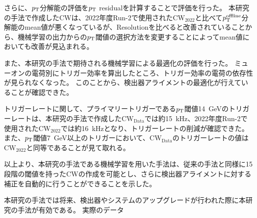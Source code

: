 さらに、$p_{\rm{T}}$分解能の評価を$p_{\rm{T}}$ residualを計算することで評価を行った。
本研究の手法で作成したCWは、2022年度Run-2で使用された$\mathrm{CW_{2022}}$と比べて$p_{\rm{T}}^{\rm{offline}}$分解能のmean値が悪くなっているが、Resolutionを比べると改善されていることから、機械学習の出力からの$p_{\rm{T}}$閾値の選択方法を変更することによってmean値においても改善が見込まれる。

また、本研究の手法で期待される機械学習による最適化の評価を行った。
ミューオンの電荷別にトリガー効率を算出したところ、トリガー効率の電荷の依存性が見られなくなった。
このことから、検出器アライメントの最適化が行えていることが確認できた。

トリガーレートに関して、プライマリートリガーである$p_{\rm{T}}$閾値14~GeVのトリガーレートは、本研究の手法で作成した$\mathrm{CW_{Data}}$では約15~kHz、2022年度Run-2で使用された$\mathrm{CW_{2022}}$では約16~kHzとなり、トリガーレートの削減が確認できた。また、$p_{\rm{T}}$閾値7~GeV以上のトリガーにおいて、$\mathrm{CW_{Data}}$のトリガーレートの値は$\mathrm{CW_{2022}}$と同等であることが見て取れる。

以上より、本研究の手法である機械学習を用いた手法は、従来の手法と同様に15段階の閾値を持ったCWの作成を可能とし、さらに検出器アライメントに対する補正を自動的に行うことができることを示した。


本研究の手法では将来、検出器やシステムのアップグレードが行われた際に本研究の手法が有効である。
実際のデータ




